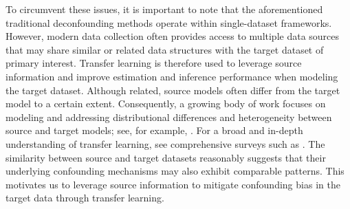 \documentclass[12pt]{article}
\begin{document}
To circumvent these issues, it is important to note that the aforementioned traditional deconfounding methods operate within single-dataset frameworks. However, modern data collection often provides access to multiple data sources that may share similar or related data structures with the target dataset of primary interest. Transfer learning is therefore used to leverage source information and improve estimation and inference performance when modeling the target dataset. Although related, source models often differ from the target model to a certain extent. Consequently, a growing body of work focuses on modeling and addressing distributional differences and heterogeneity between source and target models; see, for example, \cite{li2022transfer, lin2024profiled, tian2025learning, yuan2025optimal}. For a broad and in-depth understanding of transfer learning, see comprehensive surveys such as \cite{weiss2016survey,gholizade2025review}. The similarity between source and target datasets reasonably suggests that their underlying confounding mechanisms may also exhibit comparable patterns. This motivates us to leverage source information to mitigate confounding bias in the target data through transfer learning.

\end{document}
